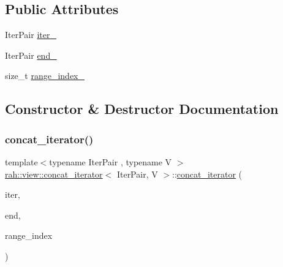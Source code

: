 \subsection*{Public Attributes}
\begin{DoxyCompactItemize}
\item 
Iter\+Pair \mbox{\hyperlink{structrah_1_1view_1_1concat__iterator_affb17b45b66a04b01962c8b84dc20c43}{iter\+\_\+}}
\item 
Iter\+Pair \mbox{\hyperlink{structrah_1_1view_1_1concat__iterator_a98e3cb2e64c68c2a5dd34da03293acea}{end\+\_\+}}
\item 
size\+\_\+t \mbox{\hyperlink{structrah_1_1view_1_1concat__iterator_af57a6e3b1baf3641831378c7919e4256}{range\+\_\+index\+\_\+}}
\end{DoxyCompactItemize}


\subsection{Constructor \& Destructor Documentation}
\mbox{\label{structrah_1_1view_1_1concat__iterator_a45e7ea9b72e7df5390a2ae09a6923d11}} 
\subsubsection{\texorpdfstring{concat\_iterator()}{concat\_iterator()}\hspace{0.1cm}{\footnotesize\ttfamily [1/2]}}
{\footnotesize\ttfamily template$<$typename Iter\+Pair , typename V $>$ \\
\mbox{\hyperlink{structrah_1_1view_1_1concat__iterator}{rah\+::view\+::concat\+\_\+iterator}}$<$ Iter\+Pair, V $>$\+::\mbox{\hyperlink{structrah_1_1view_1_1concat__iterator}{concat\+\_\+iterator}} (\begin{DoxyParamCaption}\item[{Iter\+Pair const \&}]{iter,  }\item[{Iter\+Pair const \&}]{end,  }\item[{size\+\_\+t}]{range\+\_\+index }\end{DoxyParamCaption})\hspace{0.3cm}{\ttfamily [inline]}}

